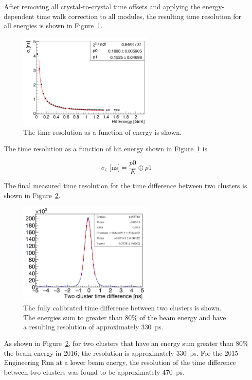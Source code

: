 After removing all crystal-to-crystal time offsets and applying the energy-dependent time walk correction to all modules, the resulting time resolution for all energies is shown in Figure~\ref{Figure:timeRes}. 

\begin{figure}[htb]
  \centering
      \includegraphics[width=0.6\textwidth]{pics/performance/timeRes2016.png}
  \caption[Time resolution of the ECal for the 2016 run ]{The time resolution as a function of energy is shown.}
  \label{Figure:timeRes}
\end{figure}

The time resolution as a function of hit energy shown in Figure~\ref{Figure:timeRes} is 

\begin{equation}
	\label{eq:twalkEqn}
		\sigma_t \textrm{ [ns]} = \dfrac{p0}{E}\oplus p1	
\end{equation}

The final measured time resolution for the time difference between two clusters is shown in Figure~\ref{Figure:timeRes2cl}.

\begin{figure}[htb]
  \centering
      \includegraphics[width=0.6\textwidth]{pics/performance/2clusterTres.png}
  \caption[Time resolution for the time difference between two clusters]{The fully calibrated time difference between two clusters is shown. The energies sum to greater than 80$\%$ of the beam energy and have a resulting resolution of approximately 330~ps.}
  \label{Figure:timeRes2cl}
\end{figure}

As shown in Figure~\ref{Figure:timeRes2cl}, for two clusters that have an energy sum greater than 80$\%$ the beam energy in 2016, the resolution is approximately 330~ps. For the 2015 Engineering Run at a lower beam energy, the resolution of the time difference between two clusters was found to be approximately 470~ps. 